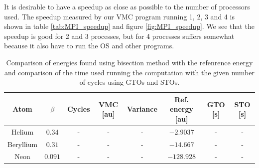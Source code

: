 		It is desirable to have a speedup as close as possible to the number of processors used. The speedup measured by our VMC program running 1, 2, 3 and 4 is shown in table \ref{tab:MPI_speedup} and figure \ref{fig:MPI_speedup}. We see that the speedup is good for 2 and 3 processes, but for 4 processes suffers somewhat because it also have to run the OS and other programs.


		\begin{table}
			\center %
			\begin{tabular}{|c|c|c|c|c|c|c|c|}
				\hline 
				Atom  & $\beta$ & Cycles & VMC {[}au{]} & Variance & Ref. energy {[}au{]} & GTO [s] & STO [s] \tabularnewline
				\hline 
				Helium &  $0.34$ & - & - & - & $-2.9037$ & - & - \tabularnewline
				\hline 
				Beryllium  &  $0.31$ & - & - & - & $-14.667$ & - & - \tabularnewline
				\hline 
				Neon  & $0.091$ & - & - & - & $-128.928$ & - & - \tabularnewline
				\hline 
			\end{tabular}\protect\caption{ Comparison of energies found using bisection method with the refenrence energy \parencite{Koput_2011_PCCP} \parencite{Binkley_1975} and comparison of the time used running the computation with the given number of cycles using GTOs and STOs.}
			\label{tab:AtomsGTO} 
		\end{table}
